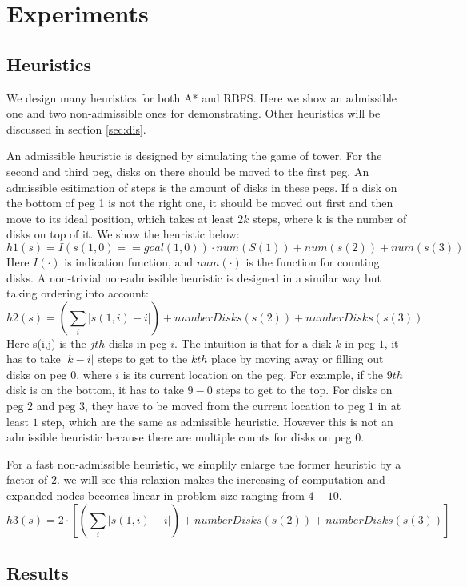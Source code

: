 \section{Experiments}\label{sec:exp}

\subsection{Heuristics}
We design many heuristics for both A* and RBFS. Here we show an admissible one and two non-admissible ones for demonstrating. Other heuristics will be discussed in section \ref{sec:dis}.

An admissible heuristic is designed by simulating the game of tower. For the second and third peg, disks on there should be moved to the first peg. An admissible esitimation of steps is the amount of disks in these pegs. If a disk on the bottom of peg 1 is not the right one, it should be moved out first and then move to its ideal position, which takes at least $2k$ steps, where k is the number of disks on top of it. We show the heuristic below:
\[
h1(s) = I(s(1,0)==goal(1,0))\cdot num(S(1)) + num(s(2)) + num(s(3))
\]
Here $I(\cdot)$ is indication function, and $num(\cdot)$ is the function for counting disks. A non-trivial non-admissible heuristic is designed in a similar way but taking ordering into account:
\[
h2(s) = (\sum_i |s(1,i)-i| ) + numberDisks(s(2)) + numberDisks(s(3))
\]
Here s(i,j) is the $jth$ disks in peg $i$. The intuition is that for a disk $k$ in peg $1$, it has to take $|k-i|$ steps to get to the $kth$ place by moving away or filling out disks on peg $0$, where $i$ is its current location on the peg. For example, if the $9th$ disk is on the bottom, it has to take $9-0$ steps to get to the top. For disks on peg $2$ and peg $3$, they have to be moved from the current location to peg $1$ in at least $1$ step, which are the same as admissible
heuristic. However this is not an admissible heuristic because there are multiple counts for disks on peg $0$. 

For a fast non-admissible heuristic, we simplily enlarge the former heuristic by a factor of $2$. we will see this relaxion makes the increasing of computation and expanded nodes becomes linear in problem size ranging from $4-10$.
\[
h3(s) = 2 \cdot [(\sum_i |s(1,i)-i| ) + numberDisks(s(2)) + numberDisks(s(3))]
\]
\subsection{Results}

